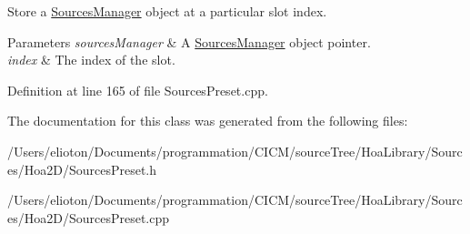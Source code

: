 Store a \hyperlink{class_hoa2_d_1_1_sources_manager}{Sources\-Manager} object at a particular slot index. 


\begin{DoxyParams}{Parameters}
{\em sources\-Manager} & A \hyperlink{class_hoa2_d_1_1_sources_manager}{Sources\-Manager} object pointer. \\
\hline
{\em index} & The index of the slot. \\
\hline
\end{DoxyParams}


Definition at line 165 of file Sources\-Preset.\-cpp.



The documentation for this class was generated from the following files\-:\begin{DoxyCompactItemize}
\item 
/\-Users/elioton/\-Documents/programmation/\-C\-I\-C\-M/source\-Tree/\-Hoa\-Library/\-Sources/\-Hoa2\-D/Sources\-Preset.\-h\item 
/\-Users/elioton/\-Documents/programmation/\-C\-I\-C\-M/source\-Tree/\-Hoa\-Library/\-Sources/\-Hoa2\-D/Sources\-Preset.\-cpp\end{DoxyCompactItemize}
